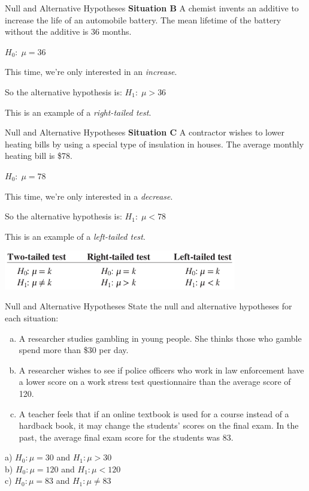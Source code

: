 \documentclass[t, aspectratio=169]{beamer}
\newcommand{\?}{\stackrel{?}{=}}
\begin{document}
	\begin{frame}{Null and Alternative Hypotheses}
		\textbf{Situation B} A chemist invents an additive to increase the life of an automobile battery. The mean lifetime of the battery without the additive is 36 months. \pause
		
		$H_0: \; \mu = 36$ \pause
		
		This time, we're only interested in an \textit{increase}. \pause
		
		So the alternative hypothesis is: $H_1: \; \mu > 36$ \pause
		
		This is an example of a \textit{right-tailed test}.
	\end{frame}

	\begin{frame}{Null and Alternative Hypotheses}
		\textbf{Situation C} A contractor wishes to lower heating bills by using a special type of insulation in houses. The average monthly heating bill is \$78. \pause
		
		$H_0: \; \mu = 78$ \pause
		
		This time, we're only interested in a \textit{decrease}. \pause
		
		So the alternative hypothesis is: $H_1: \; \mu < 78$ \pause
		
		This is an example of a \textit{left-tailed test}. \pause
		
		\includegraphics[width=4in]{test-summary.png}
	\end{frame}

	\begin{frame}{Null and Alternative Hypotheses}
		State the null and alternative hypotheses for each situation: \begin{enumerate}[a)]
			\item A researcher studies gambling in young people. She thinks those who gamble spend more than \$30 per day.
			\item A researcher wishes to see if police officers who work in law enforcement have a lower score on a work stress test questionnaire than the average score of 120.
			\item A teacher feels that if an online textbook is used for a course instead of a hardback book, it may change the students' scores on the final exam. In the past, the average final exam score for the students was 83.
		\end{enumerate} \pause
	
		a) $H_0: \mu = 30$ and $H_1: \mu > 30$ \pause \\
		b) $H_0: \mu = 120$ and $H_1: \mu < 120$ \pause \\
		c) $H_0: \mu = 83$ and $H_1: \mu \neq 83$
	\end{frame}
\end{document}
